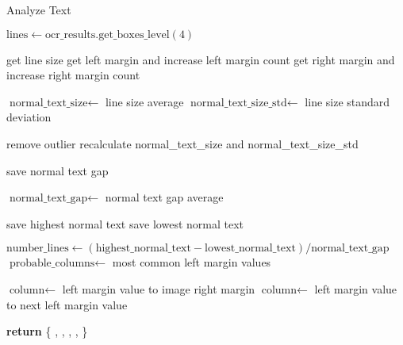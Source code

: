 \documentclass{article}
\begin{document}
\begin{algorithm}
    \caption{Analyze Text}
    \begin{algorithmic}[1]

    \State $\text{lines} \gets \text{ocr\_results.get\_boxes\_level}(4)$
    
            \State get line size
            \State get left margin and increase left margin count
            \State get right margin and increase right margin count
        \EndFor
    

        \State $\text{normal\_text\_size} \gets$ line size average
        \State $\text{normal\_text\_size\_std} \gets$ line size standard deviation
    
            \State remove outlier
            \State recalculate normal\_text\_size and normal\_text\_size\_std    
        \EndWhile
    
    
                \State save normal text gap
            \EndIf
        \EndFor

        \State $\text{normal\_text\_gap} \gets$ normal text gap average
    
                    \State save highest normal text
                \EndIf
                    \State save lowest normal text
                \EndIf
            \EndIf
        \EndFor
    
        \State $\text{number\_lines} \gets (\text{highest\_normal\_text} - \text{lowest\_normal\_text}) / \text{normal\_text\_gap}$
        \State $\text{probable\_columns} \gets$ most common left margin values

                \State $\text{column} \gets$ left margin value to image right margin
            \Else
                \State $\text{column} \gets$ left margin value to next left margin value
            \EndIf
        \EndFor
    
        \State \textbf{return} \{
            ,
            ,
            ,
            ,
        \}
    \EndFunction
    \end{algorithmic}
    \end{algorithm}
\end{document}
